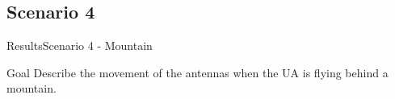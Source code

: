 \subsection{Scenario 4}

\begin{frame}{Results}{Scenario 4 - Mountain}

  \begin{block}{Goal}
	Describe the movement of the antennas when the UA is flying behind a mountain.
  \end{block}

  \begin{figure}[H]
    \centerline{
    \hfill
    }
  \end{figure}

\end{frame}



